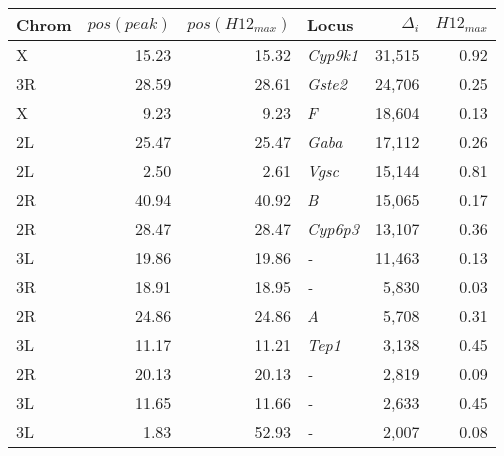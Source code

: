 \begin{tabular}{lrrlrr}
\toprule
Chrom & $pos(peak)$ & $pos(H12_{max})$ &            Locus & $\Delta_{i}$ & $H12_{max}$ \\
\midrule
    X &       15.23 &            15.32 &  \textit{Cyp9k1} &       31,515 &        0.92 \\
   3R &       28.59 &            28.61 &   \textit{Gste2} &       24,706 &        0.25 \\
    X &        9.23 &             9.23 &       \textit{F} &       18,604 &        0.13 \\
   2L &       25.47 &            25.47 &    \textit{Gaba} &       17,112 &        0.26 \\
   2L &        2.50 &             2.61 &    \textit{Vgsc} &       15,144 &        0.81 \\
   2R &       40.94 &            40.92 &       \textit{B} &       15,065 &        0.17 \\
   2R &       28.47 &            28.47 &  \textit{Cyp6p3} &       13,107 &        0.36 \\
   3L &       19.86 &            19.86 &       \textit{-} &       11,463 &        0.13 \\
   3R &       18.91 &            18.95 &       \textit{-} &        5,830 &        0.03 \\
   2R &       24.86 &            24.86 &       \textit{A} &        5,708 &        0.31 \\
   3L &       11.17 &            11.21 &    \textit{Tep1} &        3,138 &        0.45 \\
   2R &       20.13 &            20.13 &       \textit{-} &        2,819 &        0.09 \\
   3L &       11.65 &            11.66 &       \textit{-} &        2,633 &        0.45 \\
   3L &        1.83 &            52.93 &       \textit{-} &        2,007 &        0.08 \\
\bottomrule
\end{tabular}

